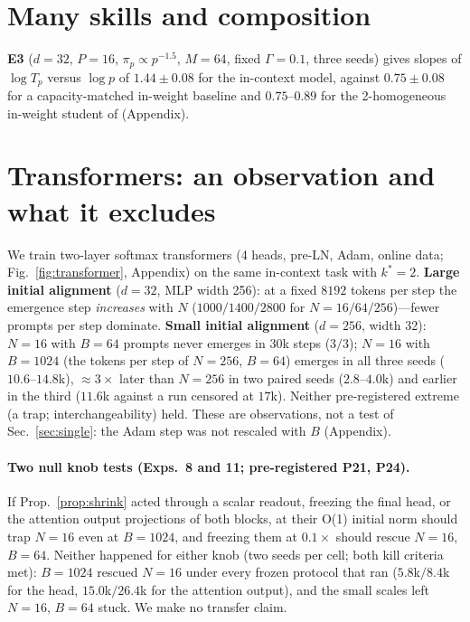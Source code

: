 \section{Many skills and composition}
\label{sec:many}
\textbf{E3} ($d=32$, $P=16$, $\pi_p\propto p^{-1.5}$, $M=64$, fixed $\Gamma=0.1$, three seeds) gives slopes of $\log T_p$ versus $\log p$ of
$1.44\pm0.08$ for the in-context model, against $0.75\pm0.08$ for a capacity-matched in-weight baseline and $0.75$--$0.89$ for the
2-homogeneous in-weight student of \citet{ren2025emergence} (Appendix).

\section{Transformers: an observation and what it excludes}
\label{sec:transformer}
We train two-layer softmax transformers (4 heads, pre-LN, Adam, online data; Fig.~\ref{fig:transformer}, Appendix) on the same in-context task with $k^*=2$.
\textbf{Large initial alignment} ($d=32$, MLP width 256): at a fixed
$8192$ tokens per step the emergence step \emph{increases} with $N$ ($1000/1400/2800$ for $N=16/64/256$)---fewer prompts per step dominate. \textbf{Small initial alignment} ($d=256$, width 32): $N=16$ with $B=64$ prompts never emerges in $30$k steps
($3/3$); $N=16$ with $B=1024$ (the tokens per step of $N=256$, $B=64$) emerges in all three seeds ($10.6$--$14.8$k), $\approx3\times$ later than $N=256$ in two
paired seeds ($2.8$--$4.0$k) and earlier in the third ($11.6$k against a run censored at $17$k). Neither pre-registered extreme (a trap; interchangeability)
held. These are observations, not a test of Sec.~\ref{sec:single}: the Adam step was not rescaled with $B$ (Appendix).

\paragraph{Two null knob tests (Exps.~8 and 11; pre-registered P21, P24).}
If Prop.~\ref{prop:shrink} acted through a scalar readout, freezing the final head, or the attention output projections of both blocks, at their O(1)
initial norm should trap $N=16$ even at $B=1024$, and freezing them at $0.1\times$ should rescue $N=16$, $B=64$. Neither happened for either knob (two
seeds per cell; both kill criteria met): $B=1024$ rescued $N=16$ under every frozen protocol that ran ($5.8$k$/8.4$k for the head, $15.0$k$/26.4$k for the
attention output), and the small scales left $N=16$, $B=64$ stuck. We make no transfer claim.

